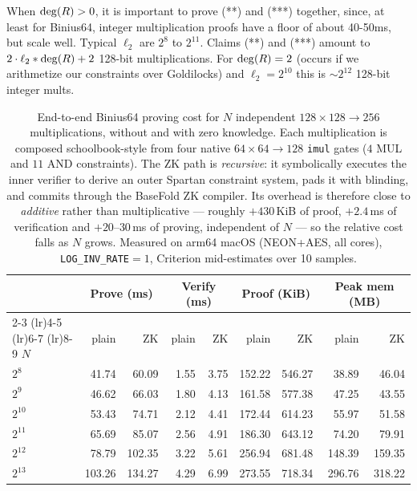 \documentclass[11pt,letterpaper,usenames,dvipsnames]{article}
\begin{document}
When $\deg(R)>0$, it is important to prove (**) and (***) together, since, at least for Binius64, integer multiplication proofs have a floor of about 40-50ms, but scale well.  Typical $\ell_2$ are $2^{8}$ to $2^{11}$. Claims (**) and (***) amount to $2\cdot \ell_2*\deg(R) +2$ 128-bit multiplications. For $\deg(R)=2$ (occurs if we arithmetize our constraints over Goldilocks) and $\ell_2=2^{10}$ this is $\sim 2^{12}$ 128-bit integer mults. 

\begin{table}[H]
  \centering
  \small
  \setlength{\tabcolsep}{4.5pt}
  \caption{End-to-end Binius64 proving cost for $N$ independent $128{\times}128{\to}256$
    multiplications, without and with zero knowledge. Each multiplication is composed
    schoolbook-style from four native $64{\times}64{\to}128$ \texttt{imul} gates ($4$ MUL and
    $11$ AND constraints). The ZK path is \emph{recursive}: it symbolically executes the inner
    verifier to derive an outer Spartan constraint system, pads it with blinding, and commits
    through the BaseFold ZK compiler. Its overhead is therefore close to \emph{additive} rather
    than multiplicative --- roughly $+430$\,KiB of proof, $+2.4$\,ms of verification and
    $+20$--$30$\,ms of proving, independent of $N$ --- so the relative cost falls as $N$ grows.
    Measured on arm64 macOS (NEON+AES, all cores), \texttt{LOG\_INV\_RATE}${}=1$, Criterion
    mid-estimates over 10 samples.}
  \label{tab:binius64-bignum128-zk}
  \begin{tabular}{@{}l rr rr rr rr@{}}
    \toprule
      & \multicolumn{2}{c}{Prove (ms)}
      & \multicolumn{2}{c}{Verify (ms)}
      & \multicolumn{2}{c}{Proof (KiB)}
      & \multicolumn{2}{c}{Peak mem (MB)} \\
    \cmidrule(lr){2-3} \cmidrule(lr){4-5} \cmidrule(lr){6-7} \cmidrule(lr){8-9}
    $N$ & plain & ZK & plain & ZK & plain & ZK & plain & ZK \\
    \midrule
    $2^{8}$  &  41.74 &  60.09 & 1.55 & 3.75 & 152.22 & 546.27 &  38.89 &  46.04 \\
    $2^{9}$  &  46.62 &  66.03 & 1.80 & 4.13 & 161.58 & 577.38 &  47.25 &  43.55 \\
    $2^{10}$ &  53.43 &  74.71 & 2.12 & 4.41 & 172.44 & 614.23 &  55.97 &  51.58 \\
    $2^{11}$ &  65.69 &  85.07 & 2.56 & 4.91 & 186.30 & 643.12 &  74.20 &  79.91 \\
    $2^{12}$ &  78.79 & 102.35 & 3.22 & 5.61 & 256.94 & 681.48 & 148.39 & 159.35 \\
    $2^{13}$ & 103.26 & 134.27 & 4.29 & 6.99 & 273.55 & 718.34 & 296.76 & 318.22 \\
    \bottomrule
  \end{tabular}
\end{table}
\end{document}
